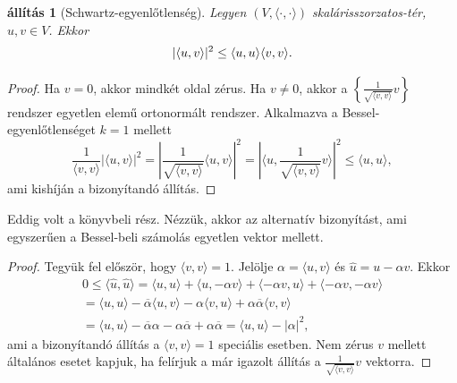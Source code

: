 \documentclass[article]{memoir}
\theoremstyle{plain}
\newtheorem{proposition}{állítás}[chapter]
\newcommand{\ip}[2]{\langle#1,#2\rangle}
\begin{document}
\begin{proposition}[Schwartz-egyenlőtlenség]\label{pr:Schwartz-egyenlőtlenség}
	Legyen $\left( V,\ip{\cdot}{\cdot} \right)$ skalárisszorzatos-tér,
	$u,v\in V$.
	Ekkor
	\[
		|\ip{u}{v}|^2\leq \ip{u}{u}\ip{v}{v}.\qedhere
	\]
\end{proposition}
\begin{proof}
	Ha $v=0$, akkor mindkét oldal zérus.
	Ha $v\neq 0$, akkor a $\left\{ \frac{1}{\sqrt{\ip{v}{v}}}v \right\}$ rendszer egyetlen elemű ortonormált rendszer.
	Alkalmazva a Bessel-egyen\-lőt\-len\-sé\-get $k=1$ mellett
	\[
		\frac{1}{\ip{v}{v}}
		\left|\ip{u}{v}\right|^2
		=
		|\frac{1}{\sqrt{\ip{v}{v}}}
		\ip{u}{v}|^2
		=
		|\ip{u}{\frac{1}{\sqrt{\ip{v}{v}}}v}|^2
		\leq \ip{u}{u},
	\]
	ami kishíján a bizonyítandó állítás.
\end{proof}

Eddig volt a könyvbeli rész. 
Nézzük, akkor az alternatív bizonyítást, ami egyszerűen a Bessel-beli számolás egyetlen vektor mellett.
\begin{proof}
Tegyük fel először, hogy $\ip{v}{v}=1$. 
Jelölje $\alpha=\ip{u}{v}$ és $\hat{u}=u-\alpha v$.
Ekkor
	\begin{multline*}
		0
		\leq
		\ip{\hat{u}}{\hat{u}}
		=
		\ip{u}{u}+\ip{u}{-\alpha v}+\ip{-\alpha v}{u}+\ip{-\alpha v}{-\alpha v}
		\\
		=
		\ip{u}{u}-\overline{\alpha}\ip{u}{v}-\alpha\ip{v}{u}+\alpha\overline{\alpha}\ip{v}{v}
		\\
		=
		\ip{u}{u}-\overline{\alpha}\alpha-\alpha\overline{\alpha}+\alpha\overline{\alpha}
		=\ip{u}{u}-|\alpha|^2,
	\end{multline*}
    ami a bizonyítandó állítás a $\ip{v}{v}=1$ speciális esetben.
    Nem zérus $v$ mellett általános esetet kapjuk, ha felírjuk a már igazolt állítás a $\frac{1}{\sqrt{\ip{v}{v}}}v$ vektorra.
\end{proof}
\end{document}
